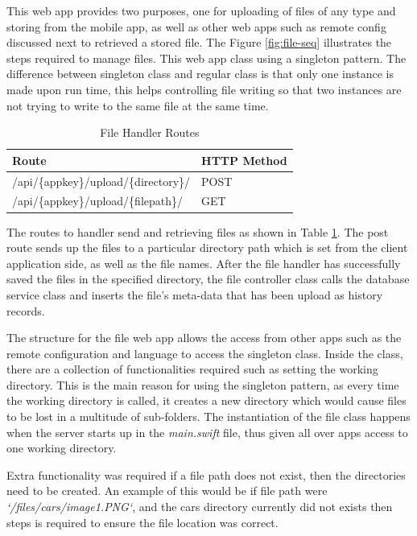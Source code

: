 This web app provides two purposes, one for uploading of files of any type and storing from the mobile app, as well as other web apps such as remote config discussed next to retrieved a stored file. The Figure \ref{fig:file-seq} illustrates the steps required to manage files. This web app class using a singleton pattern. The difference between singleton class and regular class is that only one instance is made upon run time, this helps controlling file writing so that two instances are not trying to write to the same file at the same time.

\begin{table}[!h]
\centering
\caption{File Handler Routes}
\label{tb:file-routes}
\begin{tabular}{|l|l|}
\hline
\rowcolor{green!20}
Route                                        & HTTP Method \\ \hline
/api/\{appkey\}/upload/\{directory\}/          & POST        \\ \hline
/api/\{appkey\}/upload/\{filepath\}/ & GET         \\ \hline
\end{tabular}
\end{table}


The routes to handler send and retrieving files as shown in Table \ref{tb:file-routes}. The post route sends up the files to a particular directory path which is set from the client application side, as well as the file names. After the file handler has successfully saved the files in the specified directory, the file controller class calls the database service class and inserts the file's meta-data that has been upload as history records.

The structure for the file web app allows the access from other apps such as the remote configuration and language to access the singleton class. Inside the class, there are a collection of functionalities required such as setting the working directory. This is the main reason for using the singleton pattern, as every time the working directory is called, it creates a new directory which would cause files to be lost in a multitude of sub-folders. The instantiation of the file class happens when the server starts up in the \textit{main.swift} file, thus given all over apps access to one working directory.

Extra functionality was required if a file path does not exist, then the directories need to be created. An example of this would be if file path were \textit{`/files/cars/image1.PNG`}, and the cars directory currently did not exists then steps is required to ensure the file location was correct.

